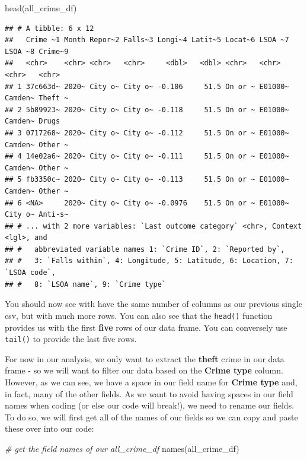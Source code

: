 \documentclass[
]{book}
\newenvironment{Shaded}{\begin{snugshade}}{\end{snugshade}}
\newcommand{\CommentTok}[1]{\textcolor[rgb]{0.56,0.35,0.01}{\textit{#1}}}
\newcommand{\FunctionTok}[1]{\textcolor[rgb]{0.00,0.00,0.00}{#1}}
\newcommand{\NormalTok}[1]{#1}
\begin{document}
\begin{Shaded}
\begin{Highlighting}[]
\FunctionTok{head}\NormalTok{(all\_crime\_df)}
\end{Highlighting}
\end{Shaded}

\begin{verbatim}
## # A tibble: 6 x 12
##   Crime ~1 Month Repor~2 Falls~3 Longi~4 Latit~5 Locat~6 LSOA ~7 LSOA ~8 Crime~9
##   <chr>    <chr> <chr>   <chr>     <dbl>   <dbl> <chr>   <chr>   <chr>   <chr>  
## 1 37c663d~ 2020~ City o~ City o~ -0.106     51.5 On or ~ E01000~ Camden~ Theft ~
## 2 5b89923~ 2020~ City o~ City o~ -0.118     51.5 On or ~ E01000~ Camden~ Drugs  
## 3 0717268~ 2020~ City o~ City o~ -0.112     51.5 On or ~ E01000~ Camden~ Other ~
## 4 14e02a6~ 2020~ City o~ City o~ -0.111     51.5 On or ~ E01000~ Camden~ Other ~
## 5 fb3350c~ 2020~ City o~ City o~ -0.113     51.5 On or ~ E01000~ Camden~ Other ~
## 6 <NA>     2020~ City o~ City o~ -0.0976    51.5 On or ~ E01000~ City o~ Anti-s~
## # ... with 2 more variables: `Last outcome category` <chr>, Context <lgl>, and
## #   abbreviated variable names 1: `Crime ID`, 2: `Reported by`,
## #   3: `Falls within`, 4: Longitude, 5: Latitude, 6: Location, 7: `LSOA code`,
## #   8: `LSOA name`, 9: `Crime type`
\end{verbatim}

You should now see with have the same number of columns as our previous single csv, but with much more rows. You can also see that the \texttt{head()} function provides us with the first \textbf{five} rows of our data frame. You can conversely use \texttt{tail()} to provide the last five rows.

For now in our analysis, we only want to extract the \textbf{theft} crime in our data frame - so we will want to filter our data based on the \textbf{Crime type} column. However, as we can see, we have a space in our field name for \textbf{Crime type} and, in fact, many of the other fields. As we want to avoid having spaces in our field names when coding (or else our code will break!), we need to rename our fields. To do so, we will first get all of the names of our fields so we can copy and paste these over into our code:

\begin{Shaded}
\begin{Highlighting}[]
\CommentTok{\# get the field names of our all\_crime\_df}
\FunctionTok{names}\NormalTok{(all\_crime\_df)}
\end{Highlighting}
\end{Shaded}
\end{document}
